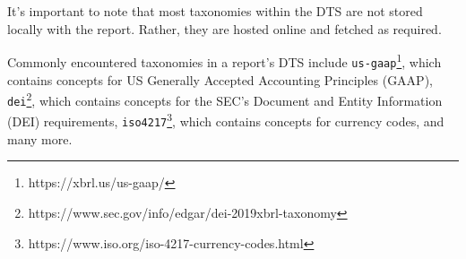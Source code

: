
It's important to note that most taxonomies within the DTS are not stored locally with the report.
Rather, they are hosted online and fetched as required.

Commonly encountered taxonomies in a report's DTS include 
\texttt{us-gaap}\footnote{https://xbrl.us/us-gaap/}, which contains concepts for US Generally Accepted Accounting Principles (GAAP),
\texttt{dei}\footnote{https://www.sec.gov/info/edgar/dei-2019xbrl-taxonomy}, which contains concepts for the SEC's Document and Entity Information (DEI) requirements,
\texttt{iso4217}\footnote{https://www.iso.org/iso-4217-currency-codes.html}, which contains concepts for currency codes, 
and many more.





